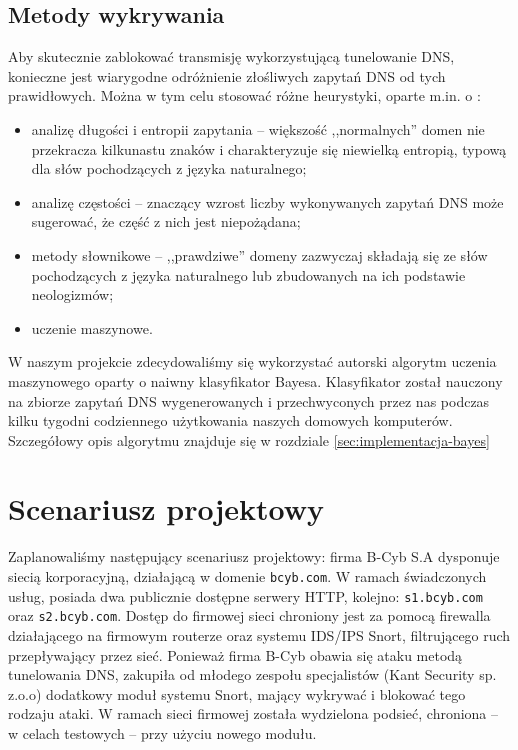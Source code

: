 \documentclass{eiti-raport}
\begin{document}
\subsection{Metody wykrywania} \label{sec:wykrywanie}
Aby skutecznie zablokować transmisję wykorzystującą tunelowanie DNS, konieczne jest wiarygodne odróżnienie złośliwych zapytań DNS od tych prawidłowych. Można w tym celu stosować różne heurystyki, oparte m.in. o \cite{sans-dns}:
\begin{itemize}
	\item analizę długości i entropii zapytania -- większość ,,normalnych'' domen nie przekracza kilkunastu znaków i charakteryzuje się niewielką entropią, typową dla słów pochodzących z języka naturalnego;
	\item analizę częstości -- znaczący wzrost liczby wykonywanych zapytań DNS może sugerować, że część z nich jest niepożądana;
	\item metody słownikowe -- ,,prawdziwe'' domeny zazwyczaj składają się ze słów pochodzących z języka naturalnego lub zbudowanych na ich podstawie neologizmów;
	\item uczenie maszynowe.
\end{itemize}
W naszym projekcie zdecydowaliśmy się wykorzystać autorski algorytm uczenia maszynowego oparty o naiwny klasyfikator Bayesa. Klasyfikator został nauczony na zbiorze zapytań DNS wygenerowanych i przechwyconych przez nas podczas kilku tygodni codziennego użytkowania naszych domowych komputerów. Szczegółowy opis algorytmu znajduje się w rozdziale \ref{sec:implementacja-bayes} 

\section{Scenariusz projektowy} \label{sec:scenariusz}
Zaplanowaliśmy następujący scenariusz projektowy: firma B-Cyb S.A dysponuje siecią korporacyjną, działającą w domenie \texttt{bcyb.com}. W ramach świadczonych usług, posiada dwa publicznie dostępne serwery HTTP, kolejno: \texttt{s1.bcyb.com} oraz \texttt{s2.bcyb.com}. Dostęp do firmowej sieci chroniony jest za pomocą firewalla działającego na firmowym routerze oraz systemu IDS/IPS Snort, filtrującego ruch przepływający przez sieć. Ponieważ firma B-Cyb obawia się ataku metodą tunelowania DNS, zakupiła od młodego zespołu specjalistów (Kant Security sp. z.o.o) dodatkowy moduł systemu Snort, mający wykrywać i blokować tego rodzaju ataki. W ramach sieci firmowej została wydzielona podsieć, chroniona -- w celach testowych -- przy użyciu nowego modułu. 
\end{document}
